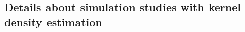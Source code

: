 \documentclass[12pt]{article}
\newcommand{\itl}{\intercal}
\newcommand{\bs}{ \boldsymbol}
\begin{document}
\subsection{Details about simulation studies with kernel density estimation}
%	
\end{document}
